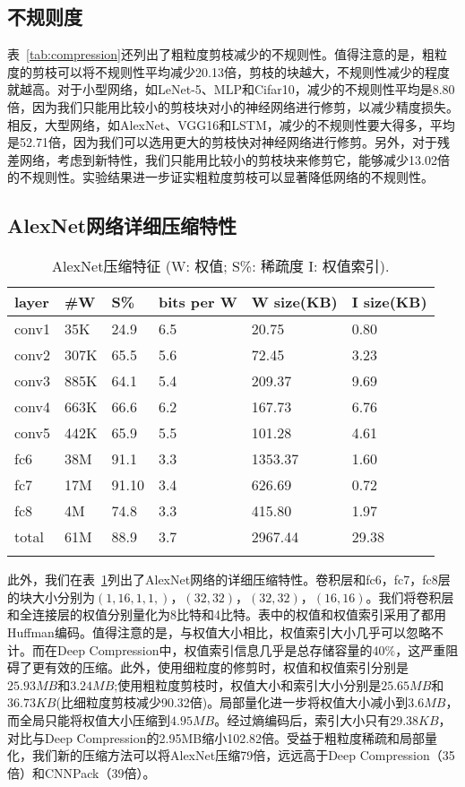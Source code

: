 \subsection{不规则度}
表~\ref{tab:compression}还列出了粗粒度剪枝减少的不规则性。值得注意的是，粗粒度的剪枝可以将不规则性平均减少20.13倍，剪枝的块越大，不规则性减少的程度就越高。对于小型网络，如LeNet-5、MLP和Cifar10，减少的不规则性平均是8.80倍，因为我们只能用比较小的剪枝块对小的神经网络进行修剪，以减少精度损失。相反，大型网络，如AlexNet、VGG16和LSTM，减少的不规则性要大得多，平均是52.71倍，因为我们可以选用更大的剪枝快对神经网络进行修剪。另外，对于残差网络，考虑到新特性，我们只能用比较小的剪枝块来修剪它，能够减少13.02倍的不规则性。实验结果进一步证实粗粒度剪枝可以显著降低网络的不规则性。


\subsection{AlexNet网络详细压缩特性}
\begin{table}[h]
\centering
\caption{AlexNet压缩特征 (W: 权值; S\%: 稀疏度 I: 权值索引).}
\begin{tabular}{llllll}
\toprule
layer  	& \#W 	& S\%		& bits per W	& W size(KB)& I size(KB) \\
\midrule
conv1 	& 35K	& 24.9		& 6.5 			& 20.75 	& 0.80 \\
conv2 	& 307K	& 65.5		& 5.6 			& 72.45 	& 3.23 \\
conv3 	& 885K	& 64.1		& 5.4 			& 209.37 	& 9.69 \\
conv4 	& 663K	& 66.6		& 6.2 			& 167.73 	& 6.76 \\
conv5 	& 442K 	& 65.9		& 5.5 			& 101.28 	& 4.61 \\
\midrule
fc6 	& 38M 	& 91.1	& 3.3			& 1353.37	& 1.60 \\
fc7 	& 17M 	& 91.10		& 3.4 			& 626.69 	& 0.72 \\
fc8 	& 4M 	& 74.8		& 3.3 			& 415.80	& 1.97 \\
\midrule
total	& 61M	& 88.9		& 3.7			& 2967.44	& 29.38 \\
\bottomrule
\label{tab:AlexNet}
\end{tabular}
\end{table}

此外，我们在表~\ref{tab:AlexNet}列出了AlexNet网络的详细压缩特性。卷积层和fc6，fc7，fc8层的块大小分别为$(1, 16, 1, 1,)$，$(32, 32)$，$(32, 32)$，$(16,16)$。我们将卷积层和全连接层的权值分别量化为8比特和4比特。表中的权值和权值索引采用了都用Huffman编码。值得注意的是，与权值大小相比，权值索引大小几乎可以忽略不计。而在Deep Compression中，权值索引信息几乎是总存储容量的40\%，这严重阻碍了更有效的压缩。此外，使用细粒度的修剪时，权值和权值索引分别是$25.93MB$和$3.24MB$;使用粗粒度剪枝时，权值大小和索引大小分别是$25.65MB$和$36.73KB$(比细粒度剪枝减少90.32倍)。局部量化进一步将权值大小减小到$3.6MB$，而全局只能将权值大小压缩到$4.95MB$。经过熵编码后，索引大小只有$29.38KB$，对比与Deep Compression的2.95MB缩小102.82倍。受益于粗粒度稀疏和局部量化，我们新的压缩方法可以将AlexNet压缩79倍，远远高于Deep Compression（35倍）和CNNPack（39倍）。

